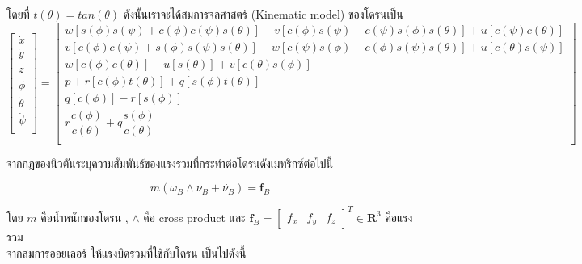 โดยที่ $t(\theta) = tan(\theta)$ ดังนั้นเราจะได้สมการจลศาสตร์ (Kinematic model) ของโดรนเป็น
\begin{equation}
	{\begin{bmatrix}
		\dot{x}  \\
		\dot{y}  \\
		\dot{z} \\
		\dot{\phi} \\
		\dot{\theta} \\
		\dot{\psi} \\
		\end{bmatrix} = 
		\begin{bmatrix}
			w[s(\phi)s(\psi)+c(\phi)c(\psi)s(\theta)]-v[c(\phi)s(\psi)-c(\psi)s(\phi)s(\theta)]+u[c(\psi)c(\theta)] \\
			v[c(\phi)c(\psi)+s(\phi)s(\psi)s(\theta)]-w[c(\psi)s(\phi)-c(\phi)s(\psi)s(\theta)]+u[c(\theta)s(\psi)] \\
			w[c(\phi)c(\theta)]-u[s(\theta)]+v[c(\theta)s(\phi)]                                                    \\
			p+r[c(\phi)t(\theta)]+q[s(\phi)t(\theta)]                                                               \\
			q[c(\phi)]-r[s(\phi)]                                                                                   \\
			r\dfrac{c(\phi)}{c(\theta)}+q\dfrac{s(\phi)}{c(\theta)}                                                 \\
		\end{bmatrix}	}
	\label{equ:kinematic model}
\end{equation}

จากกฎของนิวตันระบุความสัมพันธ์ของแรงรวมที่กระทำต่อโดรนดังเมทริกซ์ต่อไปนี้

\begin{equation}
	{ m(\omega_B\wedge \nu_B+\dot{\nu_B})=\mathbf{f}_B}
	\label{equ:total force}
\end{equation}

โดย $m$ คือน้ำหนักของโดรน , $\wedge$ คือ cross product และ $\mathbf{f}_B=\begin{bmatrix}f_x & f_y & f_z \end{bmatrix}^T \in \mathbf{R}^3$ 
คือแรงรวม
\\ จากสมการออยเลอร์ ให้แรงบิดรวมที่ใช้กับโดรน เป็นไปดังนี้

